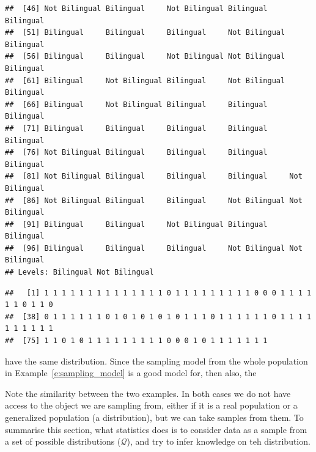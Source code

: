 \begin{example}[Sampling 2]
\begin{knitrout}
\begin{kframe}
\begin{verbatim}
##  [46] Not Bilingual Bilingual     Not Bilingual Bilingual     Bilingual    
##  [51] Bilingual     Bilingual     Bilingual     Not Bilingual Bilingual    
##  [56] Bilingual     Bilingual     Not Bilingual Not Bilingual Bilingual    
##  [61] Bilingual     Not Bilingual Bilingual     Not Bilingual Bilingual    
##  [66] Bilingual     Not Bilingual Bilingual     Bilingual     Bilingual    
##  [71] Bilingual     Bilingual     Bilingual     Bilingual     Bilingual    
##  [76] Not Bilingual Bilingual     Bilingual     Bilingual     Bilingual    
##  [81] Not Bilingual Bilingual     Bilingual     Bilingual     Not Bilingual
##  [86] Not Bilingual Bilingual     Bilingual     Not Bilingual Not Bilingual
##  [91] Bilingual     Bilingual     Not Bilingual Bilingual     Bilingual    
##  [96] Bilingual     Bilingual     Bilingual     Not Bilingual Not Bilingual
## Levels: Bilingual Not Bilingual
\end{verbatim}
\begin{alltt}
\hldef{(}    \hldef{=} \hldef{,}  \hldef{=} \hldef{(} \hlopt{==} \hldef{)))}
\end{alltt}
\begin{verbatim}
##   [1] 1 1 1 1 1 1 1 1 1 1 1 1 1 1 0 1 1 1 1 1 1 1 1 1 0 0 0 1 1 1 1 1 1 0 1 1 0
##  [38] 0 1 1 1 1 1 1 0 1 0 1 0 1 0 1 0 1 1 1 0 1 1 1 1 1 1 0 1 1 1 1 1 1 1 1 1 1
##  [75] 1 1 0 1 0 1 1 1 1 1 1 1 1 1 0 0 0 1 0 1 1 1 1 1 1 1
\end{verbatim}
\begin{alltt}
\end{alltt}
\end{kframe}
\end{knitrout}
	have the same distribution. Since the sampling model from the whole population in Example~\ref{e:sampling_model} is a good model for, then also, the 
	\end{example}

	Note the similarity between the two examples. In both cases we do not have access to the object we are sampling from, either if it is a real population or a generalized population (a distribution), but we can take samples from them. To summarise this section, what statistics does is to consider data as a sample from a set of possible distributions ($\mathcal Q$), and try to infer knowledge on teh distribution. 


